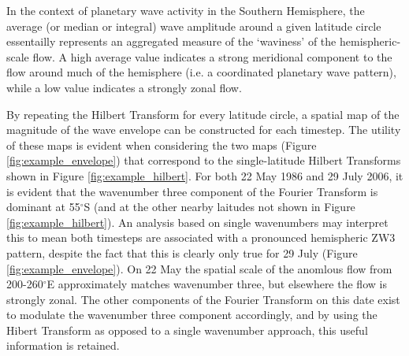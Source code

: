 In the context of planetary wave activity in the Southern Hemisphere, the average (or median or integral) wave amplitude around a given latitude circle essentailly represents an aggregated measure of the `waviness' of the hemispheric-scale flow. A high average value indicates a strong meridional component to the flow around much of the hemisphere (i.e. a coordinated planetary wave pattern), while a low value indicates a strongly zonal flow. 

By repeating the Hilbert Transform for every latitude circle, a spatial map of the magnitude of the wave envelope can be constructed for each timestep. The utility of these maps is evident when considering the two maps (Figure \ref{fig:example_envelope}) that correspond to the single-latitude Hilbert Transforms shown in Figure \ref{fig:example_hilbert}. For both 22 May 1986 and 29 July 2006, it is evident that the wavenumber three component of the Fourier Transform is dominant at 55$^{\circ}$S (and at the other nearby laitudes not shown in Figure \ref{fig:example_hilbert}). An analysis based on single wavenumbers may interpret this to mean both timesteps are associated with a pronounced hemispheric ZW3 pattern, despite the fact that this is clearly only true for 29 July (Figure \ref{fig:example_envelope}). On 22 May the spatial scale of the anomlous flow from 200-260$^{\circ}$E approximately matches wavenumber three, but elsewhere the flow is strongly zonal. The other components of the Fourier Transform on this date exist to modulate the wavenumber three component accordingly, and by using the Hibert Transform as opposed to a single wavenumber approach, this useful information is retained.
